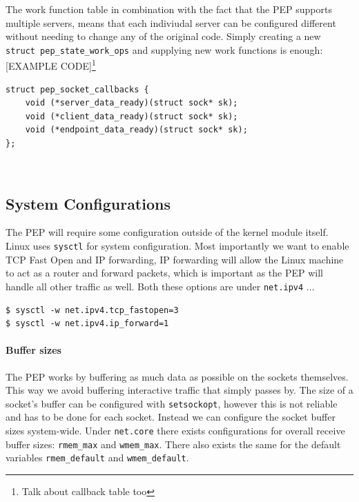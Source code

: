 \documentclass[a4paper,english, 11pt]{report}
\begin{document}
The work function table in combination with the fact that the PEP supports multiple servers, means that each indiviudal server can be configured different without needing to change any of the original code. Simply creating a new \verb|struct pep_state_work_ops| and supplying new work functions is enough:\\

[EXAMPLE CODE]\footnote{Talk about callback table too}

\noindent\begin{minipage}{\linewidth}
\begin{verbatim}
struct pep_socket_callbacks {
    void (*server_data_ready)(struct sock* sk);
    void (*client_data_ready)(struct sock* sk);
    void (*endpoint_data_ready)(struct sock* sk);
};
\end{verbatim}
\end{minipage}\\

\subsection{System Configurations}
The PEP will require some configuration outside of the kernel module itself. Linux uses \verb|sysctl| for system configuration. Most importantly we want to enable TCP Fast Open and IP forwarding, IP forwarding will allow the Linux machine to act as a router and forward packets, which is important as the PEP will handle all other traffic as well. Both these options are under \verb|net.ipv4| ...\\

\begin{verbatim}
$ sysctl -w net.ipv4.tcp_fastopen=3
$ sysctl -w net.ipv4.ip_forward=1 
\end{verbatim}

\paragraph{Buffer sizes}
The PEP works by buffering as much data as possible on the sockets themselves. This way we avoid buffering interactive traffic that simply passes by. The size of a socket's buffer can be configured with \verb|setsockopt|, however this is not reliable and has to be done for each socket. Instead we can configure the socket buffer sizes system-wide. Under \verb|net.core| there exists configurations for overall receive buffer sizes: \verb|rmem_max| and \verb|wmem_max|. There also exists the same for the default variables \verb|rmem_default| and \verb|wmem_default|.\\
\end{document}

